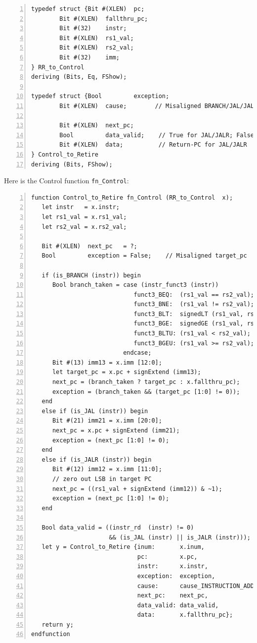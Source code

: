 {\small
\begin{Verbatim}[frame=single, numbers=left]
typedef struct {Bit #(XLEN)  pc;
		Bit #(XLEN)  fallthru_pc;
		Bit #(32)    instr;
		Bit #(XLEN)  rs1_val;
		Bit #(XLEN)  rs2_val;
		Bit #(32)    imm;
} RR_to_Control
deriving (Bits, Eq, FShow);

typedef struct {Bool         exception;
		Bit #(XLEN)  cause;        // Misaligned BRANCH/JAL/JALR target

		Bit #(XLEN)  next_pc;
		Bool         data_valid;    // True for JAL/JALR; False for BRANCH
		Bit #(XLEN)  data;          // Return-PC for JAL/JALR
} Control_to_Retire
deriving (Bits, FShow);
\end{Verbatim}
}

Here is the Control function \verb|fn_Control|:

{\small
\begin{Verbatim}[frame=single, numbers=left]
function Control_to_Retire fn_Control (RR_to_Control  x);
   let instr   = x.instr;
   let rs1_val = x.rs1_val;
   let rs2_val = x.rs2_val;

   Bit #(XLEN)  next_pc   = ?;
   Bool         exception = False;    // Misaligned target_pc

   if (is_BRANCH (instr)) begin
      Bool branch_taken = case (instr_funct3 (instr))
                             funct3_BEQ:  (rs1_val == rs2_val);
                             funct3_BNE:  (rs1_val != rs2_val);
                             funct3_BLT:  signedLT (rs1_val, rs2_val);
                             funct3_BGE:  signedGE (rs1_val, rs2_val);
                             funct3_BLTU: (rs1_val < rs2_val);
                             funct3_BGEU: (rs1_val >= rs2_val);
                          endcase;
      Bit #(13) imm13 = x.imm [12:0];
      let target_pc = x.pc + signExtend (imm13);
      next_pc = (branch_taken ? target_pc : x.fallthru_pc);
      exception = (branch_taken && (target_pc [1:0] != 0));
   end
   else if (is_JAL (instr)) begin
      Bit #(21) imm21 = x.imm [20:0];
      next_pc = x.pc + signExtend (imm21);
      exception = (next_pc [1:0] != 0);
   end
   else if (is_JALR (instr)) begin
      Bit #(12) imm12 = x.imm [11:0];
      // zero out LSB in target PC
      next_pc = ((rs1_val + signExtend (imm12)) & ~1);
      exception = (next_pc [1:0] != 0);
   end

   Bool data_valid = ((instr_rd  (instr) != 0)
                      && (is_JAL (instr) || is_JALR (instr)));
   let y = Control_to_Retire {inum:       x.inum,
                              pc:         x.pc,
                              instr:      x.instr,
                              exception:  exception,
                              cause:      cause_INSTRUCTION_ADDRESS_MISALIGNED,
                              next_pc:    next_pc,
                              data_valid: data_valid,
                              data:       x.fallthru_pc};
   return y;
endfunction
\end{Verbatim}
}

